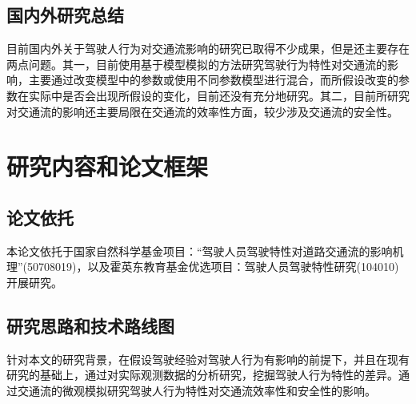 \subsection{国内外研究总结}

目前国内外关于驾驶人行为对交通流影响的研究已取得不少成果，但是还主要存在两点问题。其一，目前使用基于模型模拟的方法研究驾驶行为特性对交通流的影响，主要通过改变模型中的参数或使用不同参数模型进行混合，而所假设改变的参数在实际中是否会出现所假设的变化，目前还没有充分地研究。其二，目前所研究对交通流的影响还主要局限在交通流的效率性方面，较少涉及交通流的安全性。


%
%

\section{研究内容和论文框架}

\subsection{论文依托}

本论文依托于国家自然科学基金项目：“驾驶人员驾驶特性对道路交通流的影响机理”(50708019)，以及霍英东教育基金优选项目：驾驶人员驾驶特性研究(104010)开展研究。


\subsection{研究思路和技术路线图}
针对本文的研究背景，在假设驾驶经验对驾驶人行为有影响的前提下，并且在现有研究的基础上，通过对实际观测数据的分析研究，挖掘驾驶人行为特性的差异。通过交通流的微观模拟研究驾驶人行为特性对交通流效率性和安全性的影响。


